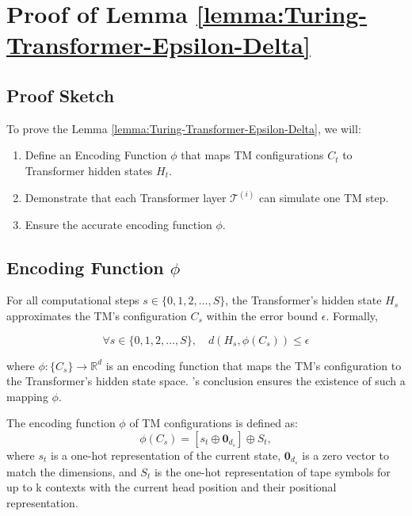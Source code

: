 {\color{black}
\section{Proof of Lemma \ref{lemma:Turing-Transformer-Epsilon-Delta}}
\label{appendix:proof1}

\subsection{Proof Sketch}

To prove the Lemma \ref{lemma:Turing-Transformer-Epsilon-Delta}, we will:
\begin{enumerate}
    \item Define an Encoding Function \( \phi \) that maps TM configurations \( C_t \) to Transformer hidden states \( H_t \).
    \item Demonstrate that each Transformer layer \( \mathcal{T}^{(i)} \) can simulate one TM step.
    \item Ensure the accurate encoding function \( \phi \).
\end{enumerate}


\subsection{Encoding Function \( \phi \)}
\label{appendix:a4}
For all computational steps \(s \in \{0, 1, 2, \dots, S\}\), the Transformer's hidden state \(H_s\) approximates the TM's configuration \(C_s\) within the error bound \(\epsilon\). Formally,

\[
\forall s \in \{0, 1, 2, \dots, S\}, \quad d(H_s, \phi(C_s)) \leq \epsilon
\]

where \(\phi: \{C_s\} \rightarrow \mathbb{R}^d\) is an encoding function that maps the TM's configuration to the Transformer's hidden state space. \citet{perez2021attention}'s conclusion ensures the existence of such a mapping \( \phi \).

\begin{definition}\label{defA1} The encoding function \(\phi\) of TM configurations is defined as:
\[\phi(C_s) =  \left[ s_t \oplus \mathbf{0}_{d_s} \right] \oplus S_t, \] where \(s_t\) is a one-hot representation of the current state, \( \mathbf{0}_{d_s} \) is a zero vector to match the dimensions, and \(S_t\) is the one-hot representation of tape symbols for up to k contexts with the current head position and their positional representation.
\end{definition}

}
